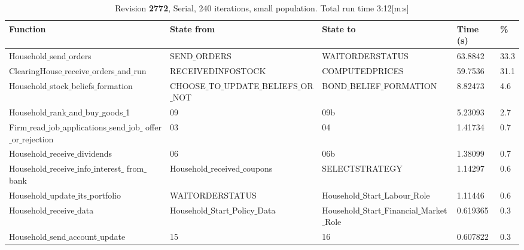 \begin{landscape}
\begin{table}
\begin{tabular}{|l|l|l|l|l|}\hline
Function & State from & State to & Time (s) & \% \\ \hline
Household$\_$send$\_$orders & SEND$\_$ORDERS & WAITORDERSTATUS &  63.8842 & 33.3 \\ \hline
ClearingHouse$\_$receive$\_$orders$\_$and$\_$run & RECEIVEDINFOSTOCK & COMPUTEDPRICES &  59.7536 & 31.1 \\ \hline
Household$\_$stock$\_$beliefs$\_$formation & CHOOSE$\_$TO$\_$UPDATE$\_$BELIEFS$\_$OR$\_$NOT & BOND$\_$BELIEF$\_$FORMATION &   8.82473 & 4.6 \\ \hline
Household$\_$rank$\_$and$\_$buy$\_$goods$\_$1 & 09 & 09b &   5.23093 & 2.7 \\ \hline
\parbox[t]{6cm}{Firm$\_$read$\_$job$\_$applications$\_$send$\_$job$\_$\\[-4pt]offer$\_$or$\_$rejection} & 03 & 04 &   1.41734 & 0.7 \\ \hline
Household$\_$receive$\_$dividends & 06 & 06b &   1.38099 & 0.7 \\ \hline
\parbox[t]{6cm}{Household$\_$receive$\_$info$\_$interest$\_$\\[-4pt]from$\_$bank} & Household$\_$received$\_$coupons & SELECTSTRATEGY &   1.14297 & 0.6 \\ \hline
Household$\_$update$\_$its$\_$portfolio & WAITORDERSTATUS & Household$\_$Start$\_$Labour$\_$Role &   1.11446 & 0.6 \\ \hline
Household$\_$receive$\_$data & Household$\_$Start$\_$Policy$\_$Data & Household$\_$Start$\_$Financial$\_$Market$\_$Role &   0.619365 & 0.3 \\ \hline
Household$\_$send$\_$account$\_$update & 15 & 16 &   0.607822 & 0.3 \\ \hline
\end{tabular}
\caption{Revision \textbf{2772}, Serial, 240 iterations, small population. Total run time 3:12[m:s]}
\end{table}



\end{landscape}
